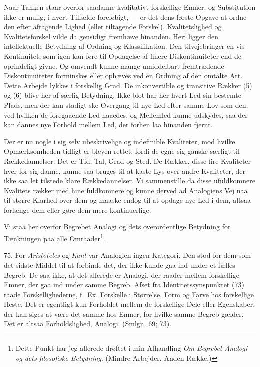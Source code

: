 \documentclass[12pt,a4paper]{book}
\newcommand{\opage}[1]{\marginnote{\footnotesize\textit{[#1]}}}
\begin{document}
Naar Tanken staar overfor saadanne kvalitativt forskellige Emner, og
Substitution ikke er mulig, i hvert Tilfælde foreløbigt, --- er det dens
første Opgave at ordne den efter aftagende Lighed (eller tiltagende
Forskel). Kvalitetslighed og Kvalitetsforskel vilde da gensidigt
fremhæve hinanden. Heri ligger den intellektuelle Betydning af Ordning
og Klassifikation. Den tilvejebringer en vis Kontinuitet, som igen kan
føre til Opdagelse af finere Diskontinuiteter end de oprindeligt givne.
Og omvendt kunne mange umiddelbart fremtrædende Diskontinuiteter
forminskes eller ophæves ved en Ordning af den omtalte Art. Dette
Arbejde lykkes i forskellig Grad. De inkonvertible og transitive Rækker
(5) og (6) blive her af særlig Betydning. Ikke blot har her hvert Led
sin bestemte Plads, men der kan stadigt ske Overgang til nye Led efter
samme Lov som den, ved hvilken de foregaaende Led naaedes, og Mellemled
kunne udskydes, saa der kan dannes nye Forhold mellem Led, der forhen
laa hinanden fjernt.

Der er nu nogle i sig selv ubeskrivelige og indefinible Kvaliteter, mod
hvilke Opmærksomheden tidligt er bleven rettet, fordi de egne sig ganske
særligt til Rækkedannelser. Det er Tid, Tal, Grad og Sted. De Rækker,
disse fire Kvaliteter hver for sig danne, kunne saa bruges til at kaste
Lys over andre Kvaliteter, der ikke saa let tilstede klare
Rækkedannelser. Vi sammenstille da disse ufuldkomnere Kvalitets%
\opage{182}rækker
med hine fuldkomnere og kunne derved ad Analogiens Vej naa til større
Klarhed over dem og maaske endog til at opdage nye Led i dem, altsaa
forlænge dem eller gøre dem mere kontinuerlige.

Vi staa her overfor Begrebet Analogi og dets overordentlige Betydning
for Tænkningen paa alle Omraader\footnote{Dette Punkt har jeg allerede
drøftet i min Afhandling \emph{Om Begrebet Analogi og dets filosofiske
Betydning}. (Mindre Arbejder. Anden Række.)}.

75. For \emph{Aristoteles} og \emph{Kant} var Analogien ingen Kategori.
Den stod for dem som det sidste Middel til at forbinde det, der ikke
kunde gaa ind under et fælles Begreb. De saa ikke, at det allerede er
Analogi, der raader mellem forskellige Emner, der gaa ind under samme
Begreb. Afset fra Identitetssynspunktet (73) raade Forskellighederne,
f.\ Ex. Forskelle i Størrelse, Form og Farve hos forskellige Heste. Det er egentligt kun Forholdet mellem de forskellige Dele eller Egenskaber,
der kan siges at være det samme hos Emner, for hvilke samme
Begreb gælder. Det er altsaa Forholdslighed, Analogi. (Smlgn. 69; 73).
\end{document}
